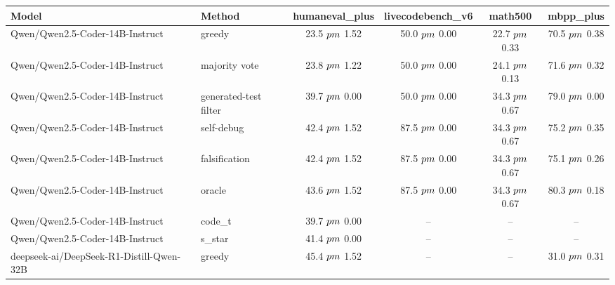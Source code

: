 \begin{tabular}{llcccc}
\toprule
Model & Method & humaneval_plus & livecodebench_v6 & math500 & mbpp_plus \\
\midrule
Qwen/Qwen2.5-Coder-14B-Instruct & greedy & 23.5 $\\pm$ 1.52 & 50.0 $\\pm$ 0.00 & 22.7 $\\pm$ 0.33 & 70.5 $\\pm$ 0.38 \\
Qwen/Qwen2.5-Coder-14B-Instruct & majority vote & 23.8 $\\pm$ 1.22 & 50.0 $\\pm$ 0.00 & 24.1 $\\pm$ 0.13 & 71.6 $\\pm$ 0.32 \\
Qwen/Qwen2.5-Coder-14B-Instruct & generated-test filter & 39.7 $\\pm$ 0.00 & 50.0 $\\pm$ 0.00 & 34.3 $\\pm$ 0.67 & 79.0 $\\pm$ 0.00 \\
Qwen/Qwen2.5-Coder-14B-Instruct & self-debug & 42.4 $\\pm$ 1.52 & 87.5 $\\pm$ 0.00 & 34.3 $\\pm$ 0.67 & 75.2 $\\pm$ 0.35 \\
Qwen/Qwen2.5-Coder-14B-Instruct & falsification & 42.4 $\\pm$ 1.52 & 87.5 $\\pm$ 0.00 & 34.3 $\\pm$ 0.67 & 75.1 $\\pm$ 0.26 \\
Qwen/Qwen2.5-Coder-14B-Instruct & oracle & 43.6 $\\pm$ 1.52 & 87.5 $\\pm$ 0.00 & 34.3 $\\pm$ 0.67 & 80.3 $\\pm$ 0.18 \\
Qwen/Qwen2.5-Coder-14B-Instruct & code_t & 39.7 $\\pm$ 0.00 & -- & -- & -- \\
Qwen/Qwen2.5-Coder-14B-Instruct & s_star & 41.4 $\\pm$ 0.00 & -- & -- & -- \\
deepseek-ai/DeepSeek-R1-Distill-Qwen-32B & greedy & 45.4 $\\pm$ 1.52 & -- & -- & 31.0 $\\pm$ 0.31 \\

\end{tabular}
